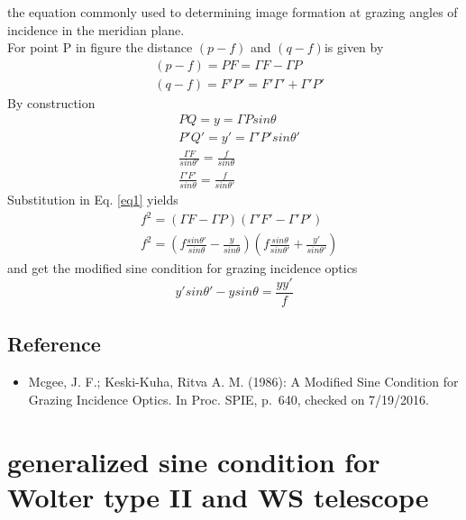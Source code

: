\documentclass[../main.tex]{subfiles}
\begin{document}
	the equation commonly used to determining image formation at grazing angles of incidence in the meridian plane.\\
	For point P in figure the distance $(p-f)$ and $(q-f)$is given by
	\begin{align}
	&(p-f)=PF=\Gamma F-\Gamma P\\
	&(q-f)=F'P'=F'\Gamma'+\Gamma'P'
	\end{align}
	By construction
	\begin{align}
	&PQ=y=\Gamma Psin\theta\\
	&P'Q'=y'=\Gamma'P'sin\theta'\\
	&\frac{\Gamma F}{sin\theta'}=\frac{f}{sin\theta}\\
	&\frac{\Gamma'F'}{sin\theta}=\frac{f}{sin\theta'}
	\end{align}
	Substitution in Eq. \ref{eq1} yields
	\begin{align}
	&f^2=(\Gamma F-\Gamma P)(\Gamma' F'-\Gamma' P')\\
	&f^2=\left(f\frac{sin\theta'}{sin\theta}-\frac{y}{sin\theta}\right)\left(f\frac{sin\theta}{sin\theta'}+\frac{y'}{sin\theta'}\right)
	\end{align}
	and get the modified sine condition for grazing incidence optics
	\begin{equation}
	y'sin\theta'-ysin\theta=\frac{yy'}{f}
	\end{equation}
	\subsection{Reference}
	\begin{itemize}  
	\item Mcgee, J. F.; Keski-Kuha, Ritva A. M. (1986): A Modified Sine Condition for Grazing Incidence Optics. In Proc. SPIE, p. 640, checked on 7/19/2016.
	\end{itemize}
	\section{generalized sine condition for Wolter type II and WS telescope}
\end{document}
